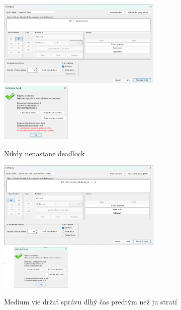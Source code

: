 \documentclass[a4paper]{article}
\begin{document}
\begin{figure}[!h]
	\centering
	\includegraphics[width=0.7\textwidth]{Q2.png}
	\includegraphics[width=0.3\textwidth]{R2.png}
	\caption{Nikdy nenastane deadlock}
\end{figure}

\begin{figure}[!h]
	\centering
	\includegraphics[width=0.7\textwidth]{Q3.png}
	\includegraphics[width=0.3\textwidth]{R3.png}
	\caption{Medium vie držať správu dlhý čas predtým než ju stratí}
\end{figure}
\end{document}
